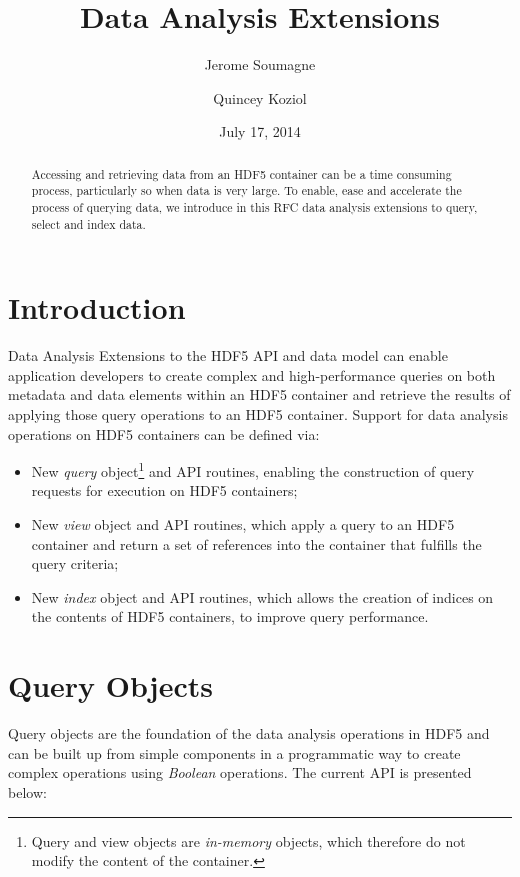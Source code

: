 \documentclass[letterpaper,hyper]{THG_RFC}
\title{Data Analysis Extensions}
\author{Jerome Soumagne}
\author{Quincey Koziol}
\date{July 17, 2014}
\begin{document}

\maketitle

\begin{abstract}
Accessing and retrieving data from an HDF5 container can be a time consuming
process, particularly so when data is very large. To enable,
ease and accelerate the process of querying data, we introduce in this RFC data
analysis extensions to query, select and index data.
\end{abstract}

\section{Introduction}
Data Analysis Extensions to the HDF5 API and data model can enable application
developers to create complex and high-performance queries on both metadata and
data elements within an HDF5 container and retrieve the results of applying
those query operations to an HDF5 container.
Support for data analysis operations on HDF5 containers can be defined via:
\begin{itemize}
\item New \textit{query} object\footnote{Query and view objects are
\textit{in-memory} objects, which therefore do not modify the content of the
container.\label{fn:object}} and API routines, enabling the construction of
query requests for execution on HDF5 containers;
\item New \textit{view} object and API routines, which apply a query to an HDF5
container and return a set of references into the container that fulfills
the query criteria;
\item New \textit{index} object and API routines, which allows the creation of
indices on the contents of HDF5 containers, to improve query performance.
\end{itemize}

\section{Query Objects}
Query objects are the foundation of the data analysis operations in HDF5 and
can be built up from simple components in a programmatic way to create complex
operations using \textit{Boolean} operations. The current API is presented
below:
\end{document}
